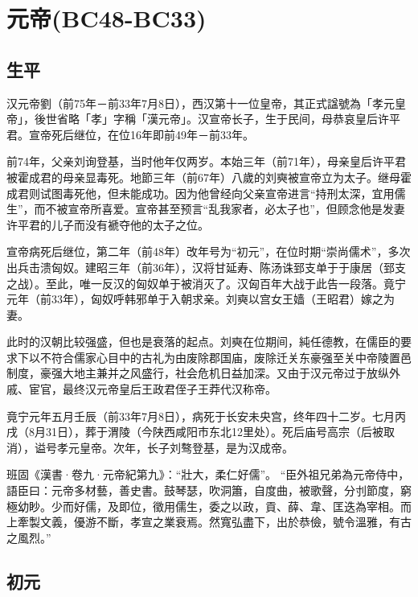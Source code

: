 
\section{元帝\tiny(BC48-BC33)}

\subsection{生平}

汉元帝劉（前75年－前33年7月8日），西汉第十一位皇帝，其正式諡號為「孝元皇帝」，後世省略「孝」字稱「漢元帝」。汉宣帝长子，生于民间，母恭哀皇后许平君。宣帝死后继位，在位16年即前49年－前33年。

前74年，父亲刘询登基，当时他年仅两岁。本始三年（前71年），母亲皇后许平君被霍成君的母亲显毒死。地節三年（前67年）八歲的刘奭被宣帝立为太子。继母霍成君则试图毒死他，但未能成功。因为他曾经向父亲宣帝进言“持刑太深，宜用儒生”，而不被宣帝所喜爱。宣帝甚至预言“乱我家者，必太子也”，但顾念他是发妻许平君的儿子而没有褫夺他的太子之位。

宣帝病死后继位，第二年（前48年）改年号为“初元”，在位时期“崇尚儒术”，多次出兵击溃匈奴。建昭三年（前36年），汉将甘延寿、陈汤诛郅支单于于康居（郅支之战）。至此，唯一反汉的匈奴单于被消灭了。汉匈百年大战于此告一段落。竟宁元年（前33年），匈奴呼韩邪单于入朝求亲。刘奭以宫女王嫱（王昭君）嫁之为妻。

此时的汉朝比较强盛，但也是衰落的起点。刘奭在位期间，純任德教，在儒臣的要求下以不符合儒家心目中的古礼为由废除郡国庙，废除迁关东豪强至关中帝陵置邑制度，豪强大地主兼并之风盛行，社会危机日益加深。又由于汉元帝过于放纵外戚、宦官，最终汉元帝皇后王政君侄子王莽代汉称帝。

竟宁元年五月壬辰（前33年7月8日），病死于长安未央宫，终年四十二岁。七月丙戌（8月31日），葬于渭陵（今陕西咸阳市东北12里处）。死后庙号高宗（后被取消），谥号孝元皇帝。次年，长子刘骜登基，是为汉成帝。

班固《漢書·卷九·元帝紀第九》：“壯大，柔仁好儒”。 “臣外祖兄弟為元帝侍中，語臣曰：元帝多材藝，善史書。鼓琴瑟，吹洞簫，自度曲，被歌聲，分刌節度，窮極幼眇。少而好儒，及即位，徵用儒生，委之以政，貢、薛、韋、匡迭為宰相。而上牽製文義，優游不斷，孝宣之業衰焉。然寬弘盡下，出於恭儉，號令溫雅，有古之風烈。”

\subsection{初元}

